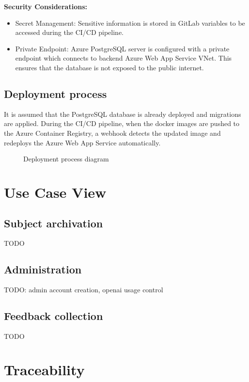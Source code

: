 \documentclass[
    english, %
]{VUMIFPSkursinis}
\begin{document}
\textbf{Security Considerations:}
\begin{itemize}
    \item Secret Management: Sensitive information is stored in GitLab variables to be accessed during the CI/CD pipeline.
    \item Private Endpoint: Azure PostgreSQL server is configured with a private endpoint which connects to backend Azure Web App Service VNet. This ensures that the database is not exposed to the public internet.
\end{itemize}

\subsection{Deployment process}

It is assumed that the PostgreSQL database is already deployed and migrations are applied. During the CI/CD pipeline, when the docker images are pushed to the Azure Container Registry, a webhook detects the updated image and redeploys the Azure Web App Service automatically.

\begin{figure}[ht]
    \centering
    
    \caption{Deployment process diagram}
    \label{deployment-process-diagram}
\end{figure}

\section{Use Case View}

\subsection{Subject archivation}

TODO

\subsection{Administration}

TODO: admin account creation, openai usage control


\subsection{Feedback collection}

TODO

\section{Traceability}

\listoffigures
\printbibliography[heading=bibintoc]
\end{document}
